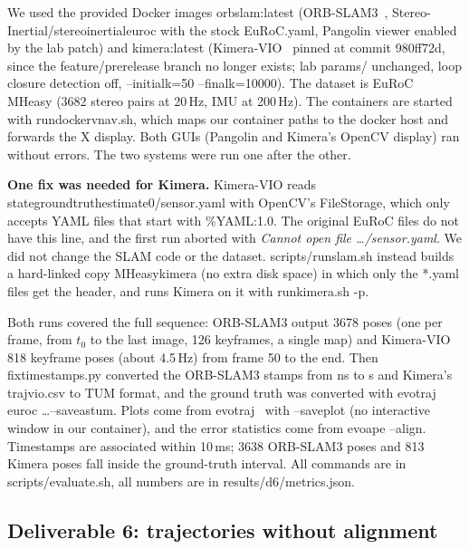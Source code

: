 \documentclass[11pt,a4paper]{article}
\DeclareRobustCommand{\code}[1]{\begingroup\ttfamily\codebreaks#1\endgroup}
\newcommand{\codebreaks}{\renewcommand{\_}{\textunderscore\allowbreak}}
\begin{document}
We used the provided Docker images \code{orbslam:latest} (ORB-SLAM3~\cite{campos2021orbslam3},
\code{Stereo-Inertial/\allowbreak stereo\_inertial\_euroc} with the stock \code{EuRoC.yaml}, Pangolin viewer
enabled by the lab patch) and \code{kimera:latest} (Kimera-VIO~\cite{rosinol2020kimera} pinned at
commit \code{980ff72d}, since the \code{feature/prerelease} branch no longer exists; lab
\code{params/} unchanged, loop closure detection off, \code{--initial\_k=50 --final\_k=10000}).
The dataset is EuRoC~\cite{burri2016euroc} \code{MH\_01\_easy} (3682 stereo pairs at 20\,Hz, IMU at
200\,Hz). The containers are started with \code{run\_docker\_vnav.sh}, which maps our container
paths to the docker host and forwards the X display. Both GUIs (Pangolin and Kimera's OpenCV
display) ran without errors. The two systems were run one after the other.

\textbf{One fix was needed for Kimera.} Kimera-VIO reads
\code{state\_groundtruth\_estimate0/\allowbreak sensor.yaml} with OpenCV's \code{FileStorage}, which only
accepts YAML files that start with \code{\%YAML:1.0}. The original EuRoC files do not have this
line, and the first run aborted with \emph{Cannot open file \dots/sensor.yaml}. We did not change
the SLAM code or the dataset. \code{scripts/run\_slam.sh} instead builds a hard-linked copy
\code{MH\_01\_easy\_kimera} (no extra disk space) in which only the \code{*.yaml} files get the
header, and runs Kimera on it with \code{run\_kimera.sh -p}.

Both runs covered the full sequence: ORB-SLAM3 output 3678 poses (one per frame, from $t_0$ to
the last image, 126 keyframes, a single map) and Kimera-VIO 818 keyframe poses (about 4.5\,Hz)
from frame 50 to the end. Then \code{fix\_timestamps.py} converted the ORB-SLAM3 stamps from
ns to s and Kimera's \code{traj\_vio.csv} to TUM format, and the ground truth was converted with
\code{evo\_traj euroc \dots --save\_as\_tum}. Plots come from \code{evo\_traj}~\cite{grupp2017evo}
with \code{--save\_plot} (no interactive window in our container), and the error statistics
come from \code{evo\_ape --align}. Timestamps are associated within 10\,ms; 3638 ORB-SLAM3 poses
and 813 Kimera poses fall inside the ground-truth interval. All commands are in
\code{scripts/evaluate.sh}, all numbers are in \code{results/d6/metrics.json}.

\subsection{Deliverable 6: trajectories without alignment}\label{sec:d6a}
\end{document}
